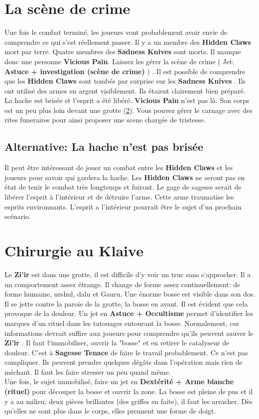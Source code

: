 \documentclass[oneside,12pt]{book}
\newcommand\roll[1]{
( Jet: \textbf{#1})
}
\newcommand{\Jessica}{\textbf{Sagesse Tenace} }
\newcommand{\Thomas}{\textbf{Zi'ir} }
\newcommand{\Sadness}{\textbf{Sadness Knives} }
\newcommand{\Hidden}{\textbf{Hidden Claws} }
\begin{document}
\begin{flushleft}
\section{La scène de crime}
Une fois le combat terminé, les joueurs vont probablement avoir envie de comprendre ce qui s'est réellement passer. Il y a un membre des \Hidden mort par terre. Quatre membres des \Sadness sont morts. Il manque donc une personne \textbf{Vicious Pain}. 
Laissez les gérer la scène de crime \roll{Astuce + investigation (scène de crime) }. Il est possible de comprendre que les \Hidden sont tombés par surprise sur les \Sadness. Ils ont utilisé des armes en argent visiblement. Ils étaient clairement bien préparé. La hache est brisée et l'esprit a été libéré. \textbf{Vicious Pain} n'est pas là. Son corps est un peu plus loin devant une grotte (\ref{chirurgie}). Vous pouvez gérer le carnage avec des rites funeraires pour ainsi proposer une scene chargée de tristesse.

\subsection{Alternative: La hache n'est pas brisée}
Il peut être intéressant de jouer un combat entre les \Hidden et les joueurs pour savoir qui gardera la hache. Les \Hidden ne seront pas en état de tenir le combat très longtemps et fuiront. Le gage de sagesse serait de libérer l'esprit à l'intérieur et de détruire l'arme. Cette arme traumatise les esprits environnants. L'esprit a l'intérieur pourrait être le sujet d'un prochain scénario. 

\section{Chirurgie au Klaive}
\label{chirurgie}
Le \Thomas est dans une grotte, il est difficile d'y voir un truc sans s`approcher. Il a un comportement assez étrange. Il change de forme assez continuellement: de forme humaine, urshul, dalu et Gauru. Une énorme bosse est visible dans son dos. Il se jette contre la paroie de la grotte, la bosse en avant. Il est évident que cela provoque de la douleur.   Un jet en \textbf{Astuce + Occultisme} permet d'identifier les marques d'un rituel dans les tatouages entourant la bosse.
Normalement, ces informations devrait suffire aux joueurs pour comprendre qu'ils peuvent sauver le \Thomas. Il faut l`immobiliser, ouvrir la "bosse" et en retirer le catalyseur de douleur. C'est à \Jessica de faire le travail probablement.
Ce n'est pas compliquer. Ils peuvent prendre quelques dégâts dans l'opération mais rien de méchant. Il faut les faire stresser un peu quand même. \\
Une fois, le sujet immobilisé, faire un jet en \textbf{Dextérité + Arme blanche (rituel)} pour découper la bosse et ouvrir la zone. La bosse est pleine de pus et il y a au milieu, deux pièces brillantes (des griffes en faite), il faut les arracher. Dès qu'elles ne sont plus dans le corps, elles prennent une forme de doigt.


\end{flushleft}
\end{document}
